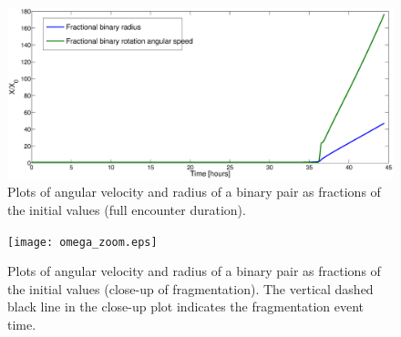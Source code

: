 \documentclass[letterpaper, preprint, paper,11pt]{AAS}	%
\begin{document}
\begin{figure}[H]
\centering
\centerline{\includegraphics[width=1.0\textwidth]{omega.eps}} 
\caption{Plots of angular velocity and radius of a binary pair as fractions of the initial values (full encounter duration).} 
\label{fig:omega}
\end{figure}
\begin{figure}
\centering
\centerline{\texttt{[image: omega\_zoom.eps]}} 
\caption{Plots of angular velocity and radius of a binary pair as fractions of the initial values (close-up of fragmentation). The vertical dashed black line in the close-up plot indicates the fragmentation event time.} 
\label{fig:omega_zoom}
\end{figure}
\end{document}
